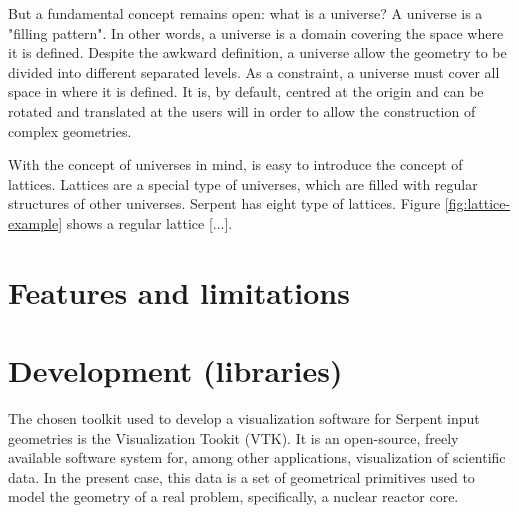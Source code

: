 \documentclass{elsarticle}
\begin{document}
But a fundamental concept remains open: what is a universe? A universe is a "filling pattern". In other words, a universe is a domain covering the space where it is defined. Despite the awkward definition, a universe allow the geometry to 
be divided into different separated levels. As a constraint, a universe must 
cover all space in where it is defined. It is, by default, centred at the 
origin and can be rotated and translated at the users will in order to allow 
the construction of complex geometries.

With the concept of universes in mind, is easy to introduce the concept of 
lattices. Lattices are a special type of universes, which are filled with 
regular structures of other universes. Serpent has eight type of lattices. 
Figure \ref{fig:lattice-example} shows a regular lattice [...].




\section{Features and limitations}

\section{Development (libraries)}

The chosen toolkit used to develop a visualization software for Serpent input 
geometries is the Visualization Tookit (VTK)\cite{vtk}. It is an open-source, 
freely available software system for, among other applications, visualization of 
scientific data. In the present case, this data is a set of geometrical 
primitives used to model the geometry of a real problem, specifically, a 
nuclear reactor core.

\end{document}
